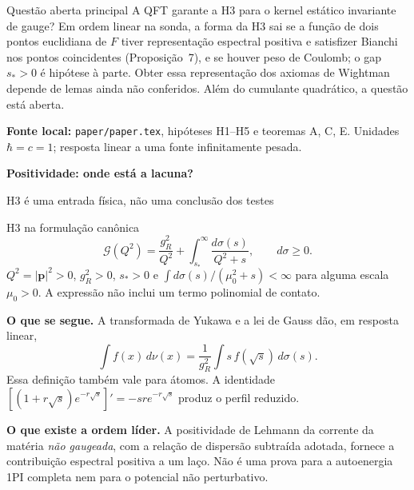 \documentclass[11pt,a4paper]{article}
\newcommand{\titlepageof}[3]{\vspace*{2mm}{\small\color{rust}\textbf{#1}}\par
 {\LARGE\bfseries\color{ink}#2}\par{\large #3}\par\vspace{2mm}}
\newcommand{\source}[1]{\vfill{\footnotesize\raggedright\color{ink}\textbf{Fonte local:} #1\par}}
\begin{document}
\begin{panel}{Questão aberta principal}
A QFT garante a H3 para o kernel estático invariante de gauge? Em ordem
linear na sonda, a forma da H3 sai se a função de dois pontos euclidiana de
$F$ tiver representação espectral positiva e satisfizer Bianchi nos pontos
coincidentes (Proposição~7), e se houver peso de Coulomb; o gap $s_*>0$
é hipótese à parte. Obter essa representação dos axiomas de Wightman
depende de lemas ainda não conferidos.
Além do cumulante quadrático, a questão está aberta.
\end{panel}
\source{\texttt{paper/paper.tex}, hipóteses H1--H5 e teoremas A, C, E.
Unidades $\hbar=c=1$; resposta linear a uma fonte infinitamente pesada.}
\newpage
\titlepageof{02 / HIPÓTESE FÍSICA}{Positividade: onde está a lacuna?}{H3 é uma entrada física, não uma conclusão dos testes}
\begin{panel}{H3 na formulação canônica}
\begin{equation*}
 \mathcal G(Q^2)=\frac{g_R^2}{Q^2}
 +\int_{s_*}^\infty\frac{d\sigma(s)}{Q^2+s},\qquad d\sigma\ge0.
\end{equation*}
$Q^2=|\mathbf p|^2>0$, $g_R^2>0$, $s_*>0$ e
$\int d\sigma(s)/(\mu_0^2+s)<\infty$ para alguma escala $\mu_0>0$.
A expressão não inclui um termo polinomial de contato.
\end{panel}
\textbf{O que se segue.} A transformada de Yukawa e a lei de Gauss dão,
em resposta linear,
\begin{equation*}
 \int f(x)\,d\nu(x)=\frac{1}{g_R^2}\int s\,f(\sqrt{s})\,d\sigma(s).
\end{equation*}
Essa definição também vale para átomos. A identidade
$[(1+r\sqrt{s})e^{-r\sqrt{s}}]'=-sr e^{-r\sqrt{s}}$ produz o perfil reduzido.

\textbf{O que existe a ordem líder.} A positividade de Lehmann da corrente
da matéria \emph{não gaugeada}, com a relação de dispersão subtraída adotada,
fornece a contribuição espectral positiva a um laço. Não é uma prova para
a autoenergia 1PI completa nem para o potencial não perturbativo.
\end{document}
